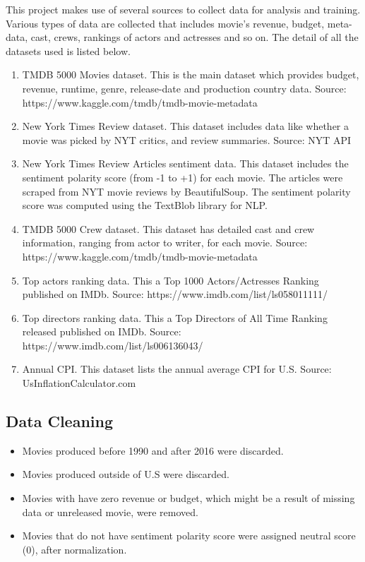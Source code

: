 \documentclass[11pt]{article}
\providecommand{\tightlist}{%
      \setlength{\itemsep}{0pt}\setlength{\parskip}{0pt}}
\begin{document}
This project makes use of several sources to collect data for analysis
and training. Various types of data are collected that includes movie's
revenue, budget, meta-data, cast, crews, rankings of actors and
actresses and so on. The detail of all the datasets used is listed
below.

\begin{enumerate}
\def\labelenumi{\arabic{enumi})}
\item
  TMDB 5000 Movies dataset. This is the main dataset which provides
  budget, revenue, runtime, genre, release-date and production country
  data. Source: https://www.kaggle.com/tmdb/tmdb-movie-metadata
\item
  New York Times Review dataset. This dataset includes data like whether
  a movie was picked by NYT critics, and review summaries. Source: NYT
  API
\item
  New York Times Review Articles sentiment data. This dataset includes
  the sentiment polarity score (from -1 to +1) for each movie. The
  articles were scraped from NYT movie reviews by BeautifulSoup. The
  sentiment polarity score was computed using the TextBlob library for
  NLP.
\item
  TMDB 5000 Crew dataset. This dataset has detailed cast and crew
  information, ranging from actor to writer, for each movie. Source:
  https://www.kaggle.com/tmdb/tmdb-movie-metadata
\item
  Top actors ranking data. This a Top 1000 Actors/Actresses Ranking
  published on IMDb. Source: https://www.imdb.com/list/ls058011111/
\item
  Top directors ranking data. This a Top Directors of All Time Ranking
  released published on IMDb. Source:
  https://www.imdb.com/list/ls006136043/
\item
  Annual CPI. This dataset lists the annual average CPI for U.S. Source:
  UsInflationCalculator.com
\end{enumerate}

\subsection{Data Cleaning}\label{data-cleaning}

\begin{itemize}
\tightlist
\item
  Movies produced before 1990 and after 2016 were discarded.
\item
  Movies produced outside of U.S were discarded.
\item
  Movies with have zero revenue or budget, which might be a result of
  missing data or unreleased movie, were removed.
\item
  Movies that do not have sentiment polarity score were assigned neutral
  score (0), after normalization.
\end{itemize}
\end{document}
